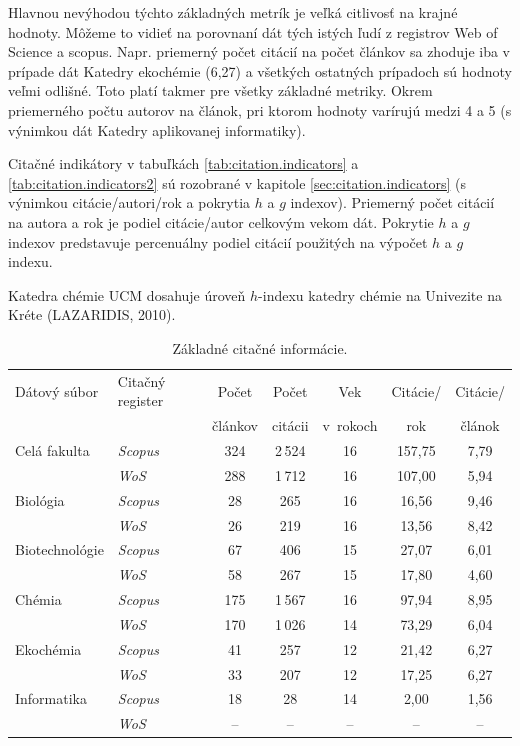 Hlavnou nevýhodou týchto základných metrík je veľká citlivosť na krajné
hodnoty. Môžeme to vidieť na porovnaní dát tých istých ľudí z registrov Web of
Science a scopus. Napr. priemerný počet citácií na počet článkov sa zhoduje iba
v prípade dát Katedry ekochémie (6,27) a všetkých ostatných prípadoch sú hodnoty
veľmi odlišné. Toto platí takmer pre všetky základné metriky. Okrem priemerného
počtu autorov na článok, pri ktorom hodnoty varírujú medzi 4 a 5 (s výnimkou dát
Katedry aplikovanej informatiky).

Citačné indikátory v tabuľkách \ref{tab:citation.indicators} a
\ref{tab:citation.indicators2} sú rozobrané v kapitole
\ref{sec:citation.indicators} (s výnimkou citácie/autori/rok a pokrytia $h$ a
$g$ indexov). Priemerný počet citácií na autora a rok je podiel citácie/autor
celkovým vekom dát. Pokrytie $h$ a $g$ indexov predstavuje percenuálny podiel
citácií použitých na výpočet $h$ a $g$ indexu.

Katedra chémie UCM dosahuje úroveň $h$-indexu katedry chémie na Univezite na Kréte
(LAZARIDIS, 2010).

\begin{table}
\centering\small
\begin{tabular}{llccccc}
  \hline\noalign{\vspace{.3ex}}
  Dátový súbor & Citačný register  & Počet   & Počet   & Vek      & Citácie/ & Citácie/ \\
               &                   & článkov & citácii & v~rokoch & rok      & článok   \\[0.3ex]
  \hline\noalign{\vspace{.5ex}}
  Celá fakulta   & \emph{Scopus} & 324 & 2\,524 & 16 & 157,75 & 7,79 \\
                 & \emph{WoS}    & 288 & 1\,712 & 16 & 107,00 & 5,94 \\[1ex]
  Biológia       & \emph{Scopus} &  28 &    265 & 16 &  16,56 & 9,46 \\
                 & \emph{WoS}    &  26 &    219 & 16 &  13,56 & 8,42 \\[1ex]
  Biotechnológie & \emph{Scopus} &  67 &    406 & 15 &  27,07 & 6,01 \\
                 & \emph{WoS}    &  58 &    267 & 15 &  17,80 & 4,60 \\[1ex]
  Chémia         & \emph{Scopus} & 175 & 1\,567 & 16 &  97,94 & 8,95 \\
                 & \emph{WoS}    & 170 & 1\,026 & 14 &  73,29 & 6,04 \\[1ex]
  Ekochémia      & \emph{Scopus} &  41 &    257 & 12 &  21,42 & 6,27 \\
                 & \emph{WoS}    &  33 &    207 & 12 &  17,25 & 6,27 \\[1ex]
  Informatika    & \emph{Scopus} &  18 &     28 & 14 &   2,00 & 1,56 \\
                 & \emph{WoS}    &  -- &     -- & -- &  --    & --   \\[0.5ex]
  \hline
\end{tabular}
\caption{Základné citačné informácie.}
\label{tab:citation.info}
\end{table}


